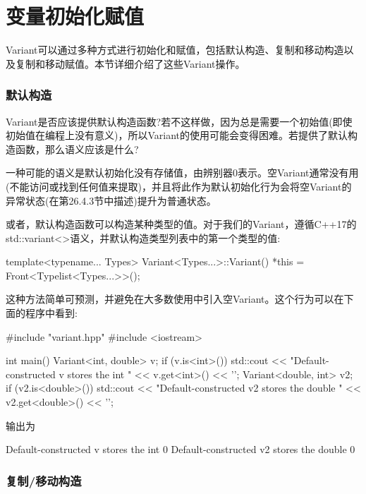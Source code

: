 \section{变量初始化赋值}
Variant可以通过多种方式进行初始化和赋值，包括默认构造、复制和移动构造以及复制和移动赋值。本节详细介绍了这些Variant操作。

\subsubsection{默认构造}

Variant是否应该提供默认构造函数?若不这样做，因为总是需要一个初始值(即使初始值在编程上没有意义)，所以Variant的使用可能会变得困难。若提供了默认构造函数，那么语义应该是什么?

一种可能的语义是默认初始化没有存储值，由辨别器0表示。空Variant通常没有用(不能访问或找到任何值来提取)，并且将此作为默认初始化行为会将空Variant的异常状态(在第26.4.3节中描述)提升为普通状态。

或者，默认构造函数可以构造某种类型的值。对于我们的Variant，遵循C++17的std::variant<>语义，并默认构造类型列表中的第一个类型的值:

\begin{cpp}
template<typename... Types>
Variant<Types...>::Variant() {
	*this = Front<Typelist<Types...>>();
}
\end{cpp}

这种方法简单可预测，并避免在大多数使用中引入空Variant。这个行为可以在下面的程序中看到:

\begin{cpp}
#include "variant.hpp"
#include <iostream>

int main()
{
	Variant<int, double> v;
	if (v.is<int>()) {
		std::cout << "Default-constructed v stores the int "
		<< v.get<int>() << ’\n’;
	}
	Variant<double, int> v2;
	if (v2.is<double>()) {
		std::cout << "Default-constructed v2 stores the double "
				<< v2.get<double>() << ’\n’;
	}
}
\end{cpp}

输出为

\begin{shell}
Default-constructed v stores the int 0
Default-constructed v2 stores the double 0
\end{shell}

\subsubsection{复制/移动构造}

